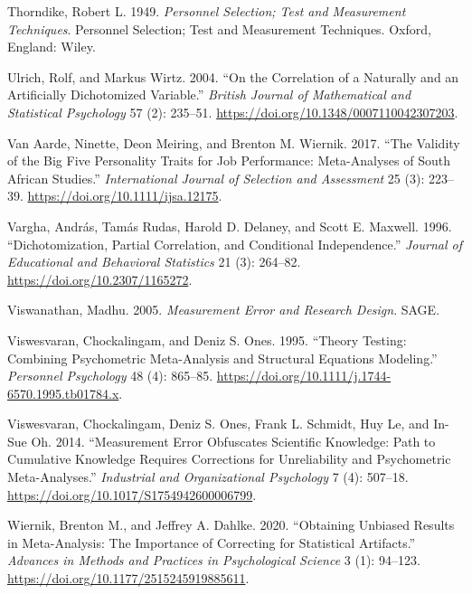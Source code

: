 \documentclass[
  letterpaper,
  DIV=11,
  numbers=noendperiod]{scrreprt}
\newlength{\cslhangindent}
\newlength{\cslentryspacingunit} %
\newenvironment{CSLReferences}[2] %
 {%
  \setlength{\parindent}{0pt}
  \ifodd #1
  \let\oldpar\par
  \def\par{\hangindent=\cslhangindent\oldpar}
  \fi
  \setlength{\parskip}{#2\cslentryspacingunit}
 }%
 {}
\begin{document}
\begin{CSLReferences}{1}{0}
\leavevmode{}%
Thorndike, Robert L. 1949. \emph{Personnel Selection; Test and
Measurement Techniques}. Personnel Selection; Test and Measurement
Techniques. Oxford, England: Wiley.

\leavevmode{}%
Ulrich, Rolf, and Markus Wirtz. 2004. {``On the Correlation of a
Naturally and an Artificially Dichotomized Variable.''} \emph{British
Journal of Mathematical and Statistical Psychology} 57 (2): 235--51.
\url{https://doi.org/10.1348/0007110042307203}.

\leavevmode{}%
Van Aarde, Ninette, Deon Meiring, and Brenton M. Wiernik. 2017. {``The
Validity of the Big Five Personality Traits for Job Performance:
Meta{-}Analyses of South African Studies.''} \emph{International Journal
of Selection and Assessment} 25 (3): 223--39.
\url{https://doi.org/10.1111/ijsa.12175}.

\leavevmode{}%
Vargha, András, Tamás Rudas, Harold D. Delaney, and Scott E. Maxwell.
1996. {``Dichotomization, Partial Correlation, and Conditional
Independence.''} \emph{Journal of Educational and Behavioral Statistics}
21 (3): 264--82. \url{https://doi.org/10.2307/1165272}.

\leavevmode{}%
Viswanathan, Madhu. 2005. \emph{Measurement Error and Research Design}.
SAGE.

\leavevmode{}%
Viswesvaran, Chockalingam, and Deniz S. Ones. 1995. {``Theory Testing:
Combining Psychometric Meta-Analysis and Structural Equations
Modeling.''} \emph{Personnel Psychology} 48 (4): 865--85.
\url{https://doi.org/10.1111/j.1744-6570.1995.tb01784.x}.

\leavevmode{}%
Viswesvaran, Chockalingam, Deniz S. Ones, Frank L. Schmidt, Huy Le, and
In-Sue Oh. 2014. {``Measurement Error Obfuscates Scientific Knowledge:
Path to Cumulative Knowledge Requires Corrections for Unreliability and
Psychometric Meta-Analyses.''} \emph{Industrial and Organizational
Psychology} 7 (4): 507--18.
\url{https://doi.org/10.1017/S1754942600006799}.

\leavevmode{}%
Wiernik, Brenton M., and Jeffrey A. Dahlke. 2020. {``Obtaining Unbiased
Results in Meta-Analysis: The Importance of Correcting for Statistical
Artifacts.''} \emph{Advances in Methods and Practices in Psychological
Science} 3 (1): 94--123. \url{https://doi.org/10.1177/2515245919885611}.

\end{CSLReferences}
\end{document}
